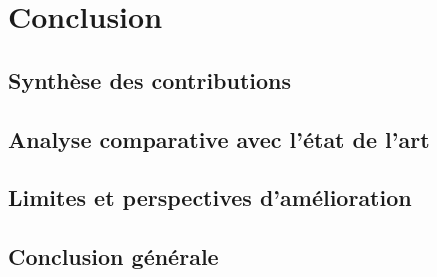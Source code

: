 \chapter{Conclusion}
\label{chap:conclusion}

\lipsum[1]

\localtableofcontents

\newpage

\section{Synthèse des contributions}

\section{Analyse comparative avec l'état de l'art}

\section{Limites et perspectives d'amélioration}

\section{Conclusion générale}
